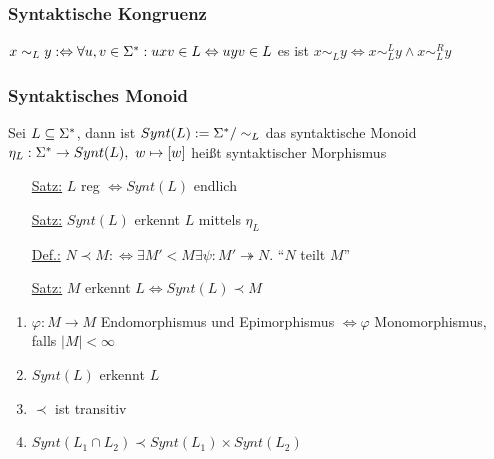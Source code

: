         \subsubsection{Syntaktische Kongruenz}
            $x\sim_L y :\Leftrightarrow \forall u,v\in\Sigma^*:uxv\in L\Leftrightarrow uyv\in L$ es ist $x\sim_L y\Leftrightarrow x\sim_L^L y\wedge x\sim_L^R y$
        \subsubsection{Syntaktisches Monoid}
            Sei $L\subseteq\Sigma^*$, dann ist $Synt(L):=\Sigma^*/\sim_L$ das syntaktische Monoid\\
            $\eta_L:\Sigmas\rightarrow Synt(L),\ w\mapsto[w]$ heißt syntaktischer Morphismus
            \begin{itemize}
                \item[\underline{Satz:}] $L$ reg $\Leftrightarrow Synt(L)$ endlich
                \item[\underline{Satz:}] $Synt(L)$ erkennt $L$ mittels $\eta_L$
                \item[\underline{Def.:}] $N\prec M :\Leftrightarrow \exists M'<M\exists\psi:M'\twoheadrightarrow N$. ``$N$ teilt $M$''
                \item[\underline{Satz:}] $M$ erkennt $L\Leftrightarrow Synt(L)\prec M$
            \end{itemize}
            \begin{enumerate}[1)]
                \item $\varphi:M\rightarrow M$ Endomorphismus und Epimorphismus $\Leftrightarrow \varphi$ Monomorphismus, falls $|M|<\infty$
                \item $Synt(L)$ erkennt $L$
                \item $\prec$ ist transitiv
                \item $Synt(L_1\cap L_2)\prec Synt(L_1)\times Synt(L_2)$
            \end{enumerate}
